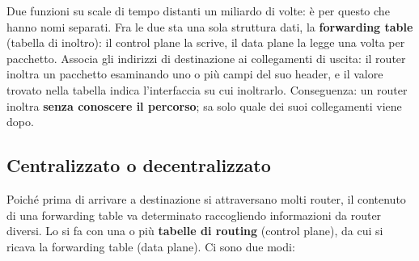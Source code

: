 Due funzioni su scale di tempo distanti un miliardo di volte: è per questo che hanno nomi separati. Fra le due sta una
sola struttura dati, la \textbf{forwarding table} (tabella di inoltro): il control plane la scrive, il data plane la legge
una volta per pacchetto. Associa gli indirizzi di destinazione ai collegamenti di uscita: il router inoltra un pacchetto
esaminando uno o più campi del suo header, e il valore trovato nella tabella indica l'interfaccia su cui inoltrarlo.
Conseguenza: un router inoltra \textbf{senza conoscere il percorso}; sa solo quale dei suoi collegamenti viene dopo.


\subsection{Centralizzato o decentralizzato}

Poiché prima di arrivare a destinazione si attraversano molti router, il contenuto di una forwarding table va
determinato raccogliendo informazioni da router diversi. Lo si fa con una o più \textbf{tabelle di routing}
(control plane), da cui si ricava la forwarding table (data plane). Ci sono due modi:


